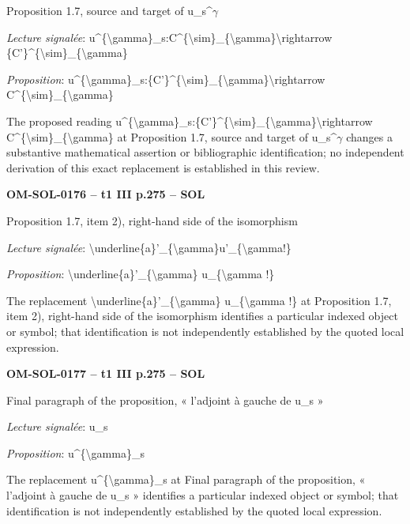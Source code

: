Proposition 1.7, source and target of u\_s\textasciicircum{}\ensuremath{\gamma}\par
\emph{Lecture signalée}: u\textasciicircum{}\{\textbackslash{}gamma\}\_s:C\textasciicircum{}\{\textbackslash{}sim\}\_\{\textbackslash{}gamma\}\textbackslash{}rightarrow \{C'\}\textasciicircum{}\{\textbackslash{}sim\}\_\{\textbackslash{}gamma\}\par
\emph{Proposition}: u\textasciicircum{}\{\textbackslash{}gamma\}\_s:\{C'\}\textasciicircum{}\{\textbackslash{}sim\}\_\{\textbackslash{}gamma\}\textbackslash{}rightarrow C\textasciicircum{}\{\textbackslash{}sim\}\_\{\textbackslash{}gamma\}\par
The proposed reading u\textasciicircum{}\{\textbackslash{}gamma\}\_s:\{C'\}\textasciicircum{}\{\textbackslash{}sim\}\_\{\textbackslash{}gamma\}\textbackslash{}rightarrow C\textasciicircum{}\{\textbackslash{}sim\}\_\{\textbackslash{}gamma\} at Proposition 1.7, source and target of u\_s\textasciicircum{}\ensuremath{\gamma} changes a substantive mathematical assertion or bibliographic identification; no independent derivation of this exact replacement is established in this review.\par
\par\noindent\textbf{OM-SOL-0176 -- t1 III p.275 -- SOL}\par
Proposition 1.7, item 2), right-hand side of the isomorphism\par
\emph{Lecture signalée}: \textbackslash{}underline\{a\}'\_\{\textbackslash{}gamma\}u'\_\{\textbackslash{}gamma!\}\par
\emph{Proposition}: \textbackslash{}underline\{a\}'\_\{\textbackslash{}gamma\} u\_\{\textbackslash{}gamma !\}\par
The replacement \textbackslash{}underline\{a\}'\_\{\textbackslash{}gamma\} u\_\{\textbackslash{}gamma !\} at Proposition 1.7, item 2), right-hand side of the isomorphism identifies a particular indexed object or symbol; that identification is not independently established by the quoted local expression.\par
\par\noindent\textbf{OM-SOL-0177 -- t1 III p.275 -- SOL}\par
Final paragraph of the proposition, « l'adjoint à gauche de u\_s »\par
\emph{Lecture signalée}: u\_s\par
\emph{Proposition}: u\textasciicircum{}\{\textbackslash{}gamma\}\_s\par
The replacement u\textasciicircum{}\{\textbackslash{}gamma\}\_s at Final paragraph of the proposition, « l'adjoint à gauche de u\_s » identifies a particular indexed object or symbol; that identification is not independently established by the quoted local expression.\par
